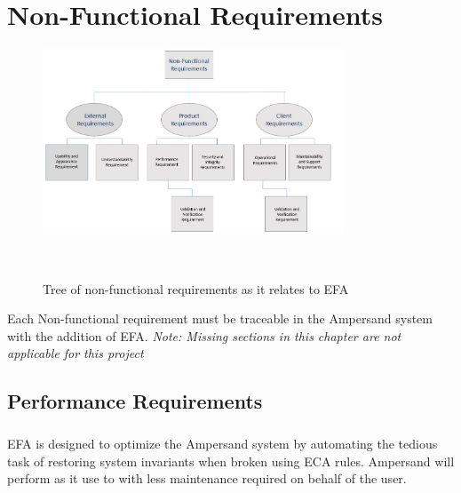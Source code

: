 \documentclass[12pt]{report}
\begin{document}
{\chapter{Non-Functional Requirements}\label{ch:NonFunc}
\begin{figure}[!htb]
	\centering
	\includegraphics[width=0.8\textwidth]{../figures/NONFUNCTIONAL}
	\caption{Tree of non-functional requirements as it relates to 
	EFA}~\label{fig:figure2} 
\end{figure}
    Each Non-functional requirement must be traceable in the Ampersand system 
    with the addition of EFA. 
    \textit{Note: Missing sections in this chapter are not applicable for this 
    project }    

\section{Performance Requirements}\label{sec:Performance}
\paragraph*{}
EFA is designed to optimize 
the Ampersand system by automating the tedious task 
of restoring system invariants when broken using ECA rules. 
Ampersand will 
perform as it use to with less maintenance required on behalf of the user.


}
\end{document}
